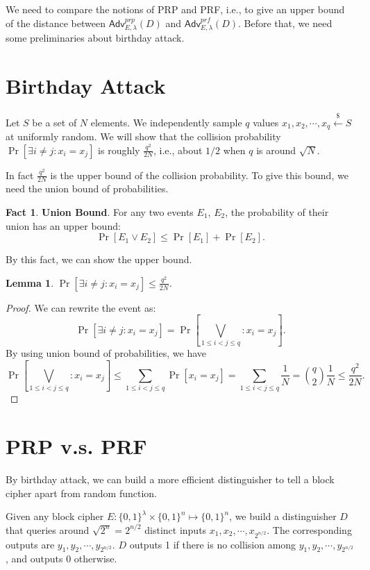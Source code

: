 \documentclass[12pt]{article}
\newcommand{\bits}{\{0,1\}}
\newcommand{\getsr}{\stackrel{\$}{\gets}}
\newcommand{\Adv}{\mathsf{Adv}}
\newtheorem{lemma}[theorem]{Lemma}
\theoremstyle{definition}
\newtheorem{fact}[theorem]{Fact}
\begin{document}
We need to compare the notions of PRP and PRF, i.e., to give an upper bound of the distance between $\Adv_{E,\lambda}^{prp}(D)$ and $\Adv_{E,\lambda}^{prf}(D)$. Before that, we need some preliminaries about birthday attack.

\section{Birthday Attack}
Let $S$ be a set of $N$ elements. We independently sample $q$ values $x_1, x_2, \cdots, x_q \getsr S$ at uniformly random. We will show that the collision probability $\Pr[\exists i\not= j : x_i = x_j]$ is roughly $\frac{q^2}{2N}$, i.e., about $1/2$ when $q$ is around $\sqrt{N}$.

In fact $\frac{q^2}{2N}$ is the upper bound of the collision probability. To give this bound, we need the union bound of probabilities.

\begin{fact}
{\bf Union Bound}. For any two events $E_1$, $E_2$, the probability of their union has an upper bound:
$$\Pr[E_1 \vee E_2] \leq \Pr[E_1] + \Pr[E_2].$$
\end{fact}

By this fact, we can show the upper bound.

\begin{lemma}
$\Pr[\exists i\not= j : x_i = x_j] \leq \frac{q^2}{2N}$.
\end{lemma}
\begin{proof}
We can rewrite the event as:
$$\Pr[\exists i\not= j : x_i = x_j] = \Pr[\bigvee_{1 \leq i < j \leq q} : x_i = x_j].$$
By using union bound of probabilities, we have
$$\Pr[\bigvee_{1 \leq i < j \leq q} : x_i = x_j] \leq \sum_{1\leq i < j \leq q}\Pr[x_i=x_j] = \sum_{1\leq i < j \leq q} \frac{1}{N} = \binom{q}{2} \frac{1}{N} \leq \frac{q^2}{2N}.$$
\end{proof}

\section{PRP v.s. PRF}
By birthday attack, we can build a more efficient distinguisher to tell a block cipher apart from random function. 

Given any block cipher $E : \bits^\lambda \times \bits^n \mapsto \bits^n$, we build a distinguisher $D$ that queries around $\sqrt{2^n} = 2^{n/2}$ distinct inputs $x_1, x_2, \cdots, x_{2^{n/2}}$. The corresponding outputs are $y_1, y_2, \cdots, y_{2^{n/2}}$. $D$ outputs 1 if there is no collision among $y_1, y_2, \cdots, y_{2^{n/2}}$, and outputs 0 otherwise.
\end{document}
